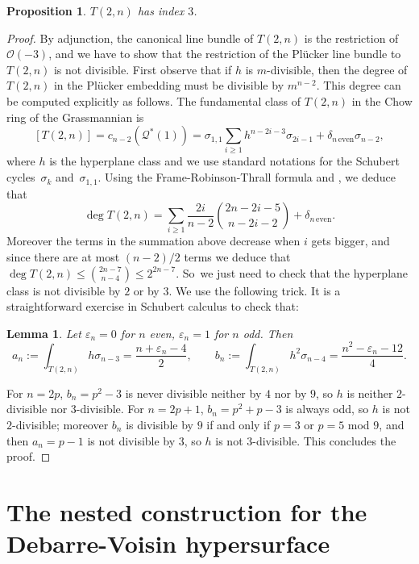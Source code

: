\documentclass[JEP,XML,SOM,Unicode,NoEqCountersInSection]{cedram}
\let\epsilon\varepsilon
\let\mathcal\mathscr
\theoremstyle{plain}
\newtheorem{prop}[theorem]{Proposition}
\newtheorem{lemma}[theorem]{Lemma}
\theoremstyle{definition}
\newcommand{\sheaf}[1]{\mathcal{#1}}
\newcommand{\ko}{\sheaf{O}}\let\OO\ko\let\cO\ko
\newcommand{\kq}{\sheaf{Q}}
\begin{document}
\begin{prop} $T(2,n)$ has index $3$. \end{prop}

\begin{proof}
By adjunction, the canonical line bundle of $T(2,n)$ is the restriction of
$\ko(-3)$, and we have to show that the restriction of the Plücker line
bundle to $T(2,n)$ is not divisible. First observe that if $h$ is $m$-divisible,
then the degree of $T(2,n)$ in the Plücker embedding must be divisible by
$m^{n-2}$. This degree can be computed explicitly as follows. The fundamental class
of $T(2,n)$ in the Chow ring of the Grassmannian is
\[
[T(2,n)]=c_{n-2}(\kq^*(1))=\sigma_{1,1}\sum_{i\ge 1}h^{n-2i-3}\sigma_{2i-1}+\delta_{n\,\text{even}}\sigma_{n-2},
\]
where $h$ is the hyperplane class and we use standard notations for the Schubert cycles~$\sigma_k$ and~$\sigma_{1,1}$. Using the Frame-Robinson-Thrall formula and \cite[Cor.\,3.2.14]{schubert}, we deduce that
\[
\deg T(2,n) = \sum_{i\ge 1}\frac{2i}{n-2} \binom{2n-2i-5}{n-2i-2}+\delta_{n\,\text{even}}.
\]
Moreover the terms in the summation above
decrease when $i$ gets bigger, and since there are at most $(n-2)/2$ terms we deduce that
$\deg T(2,n)\le \binom{2n-7}{n-4}\le 2^{2n-7}$. So~we just need to check that the hyperplane class is not divisible by $2$ or by $3$. We use the following trick. It is a straightforward exercise in Schubert calculus to check that:

\begin{lemma} Let $\epsilon_n=0$ for $n$ even, $\epsilon_n=1$ for $n$ odd. Then\vspace*{-3pt}
\[
a_n := \int_{T(2,n)}h\sigma_{n-3}=\frac{n+\epsilon_n-4}{2}, \qquad b_n:=\int_{T(2,n)}h^2\sigma_{n-4}=\frac{n^2-\epsilon_n-12}{4}.
\]
\end{lemma}

For $n=2p$, $b_{n}=p^2-3$ is never divisible neither by $4$ nor by $9$, so $h$ is neither
$2$-divisible nor $3$-divisible. For $n=2p+1$, $b_{n}=p^2+p-3$ is always odd, so $h$ is not
$2$-divisible; moreover $b_n$ is divisible by $9$ if and only if $p=3$ or $p=5$ mod $9$,
and then $a_n=p-1$ is not divisible by $3$, so $h$ is not $3$-divisible. This concludes
the proof.
\end{proof}

\section{The nested construction for the Debarre-Voisin hypersurface}\label{sect:DV}
\end{document}
